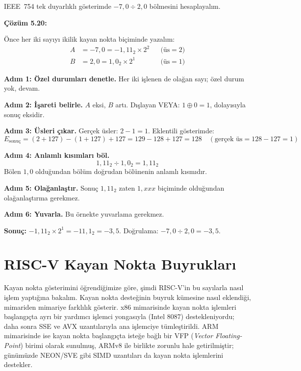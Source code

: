 \begin{ornek}[5.20]
IEEE~754 tek duyarlıklı gösterimde $-7{,}0 \div 2{,}0$ bölmesini hesaplayalım.

\textbf{Çözüm 5.20:}

Önce her iki sayıyı ikilik kayan nokta biçiminde yazalım:
\begin{align*}
A &= -7{,}0 = -1{,}11_2 \times 2^{2} &&\text{(üs} = 2\text{)} \\
B &= 2{,}0 = 1{,}0_2 \times 2^{1} &&\text{(üs} = 1\text{)}
\end{align*}

\textbf{Adım 1: Özel durumları denetle.} Her iki işlenen de olağan sayı; özel durum yok, devam.

\textbf{Adım 2: İşareti belirle.} $A$ eksi, $B$ artı. Dışlayan VEYA: $1 \oplus 0 = 1$, dolayısıyla sonuç eksidir.

\textbf{Adım 3: Üsleri çıkar.} Gerçek üsler: $2 - 1 = 1$. Eklentili gösterimde:
\[
E_\text{sonuç} = (2 + 127) - (1 + 127) + 127 = 129 - 128 + 127 = 128 \quad (\text{gerçek üs} = 128 - 127 = 1)
\]

\textbf{Adım 4: Anlamlı kısımları böl.}
\[
1{,}11_2 \div 1{,}0_2 = 1{,}11_2
\]
Bölen $1{,}0$ olduğundan bölüm doğrudan bölünenin anlamlı kısmıdır.

\textbf{Adım 5: Olağanlaştır.} Sonuç $1{,}11_2$ zaten $1{,}xxx$ biçiminde olduğundan olağanlaştırma gerekmez.

\textbf{Adım 6: Yuvarla.} Bu örnekte yuvarlama gerekmez.

\textbf{Sonuç:} $-1{,}11_2 \times 2^{1} = -11{,}1_2 = -3{,}5$. Doğrulama: $-7{,}0 \div 2{,}0 = -3{,}5$. \checkmark
\end{ornek}

\section{RISC-V Kayan Nokta Buyrukları}
\label{sec:riscv-kayan-nokta}

Kayan nokta gösterimini öğrendiğimize göre, şimdi RISC-V'in bu sayılarla nasıl işlem yaptığına bakalım. Kayan nokta desteğinin buyruk kümesine nasıl eklendiği, mimariden mimariye farklılık gösterir. x86 mimarisinde kayan nokta işlemleri başlangıçta ayrı bir yardımcı işlemci yongasıyla (Intel 8087) destekleniyordu; daha sonra SSE ve AVX uzantılarıyla ana işlemciye tümleştirildi. ARM mimarisinde ise kayan nokta başlangıçta isteğe bağlı bir VFP (\emph{Vector Floating-Point}) birimi olarak sunulmuş, ARMv8 ile birlikte zorunlu hale getirilmiştir; günümüzde NEON/SVE gibi SIMD uzantıları da kayan nokta işlemlerini destekler.

